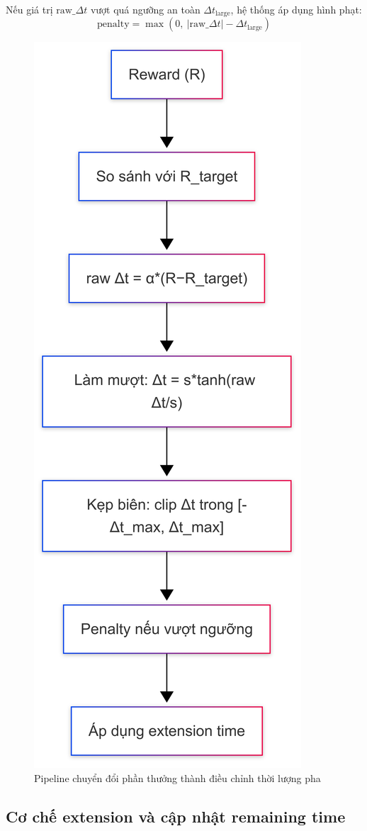 Nếu giá trị \(\text{raw\_}\Delta t\) vượt quá ngưỡng an toàn \(\Delta t_{\text{large}}\), hệ thống áp dụng hình phạt:
\[
\text{penalty} = \max\left(0,\ |\text{raw\_}\Delta t| - \Delta t_{\text{large}}\right)
\]

\begin{figure}[H]
    \centering
    \includegraphics[width=0.55\linewidth]{Untitled diagram _ Mermaid Chart-2025-08-22-100758.png}
    \caption{Pipeline chuyển đổi phần thưởng thành điều chỉnh thời lượng pha}
    \label{fig:dynamic_timing_pipeline}
\end{figure}

\subsection{Cơ chế extension và cập nhật remaining time}

